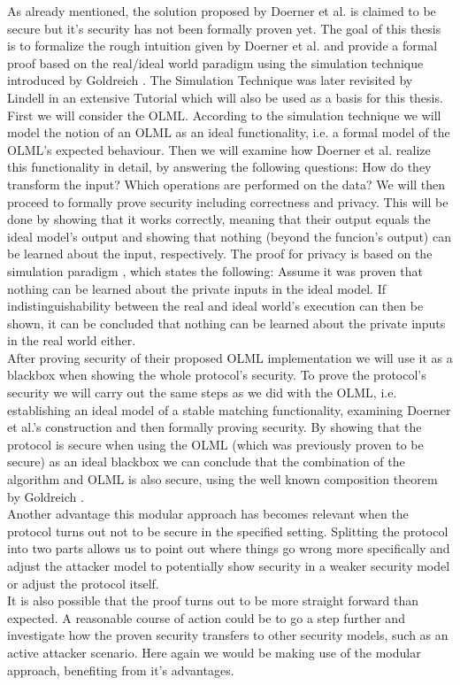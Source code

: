 As already mentioned, the solution proposed by Doerner et al. \citep{smas} is claimed to be secure but it's security has not been formally proven yet. The goal of this thesis is to formalize the rough intuition given by Doerner et al. and provide a formal proof based on the real/ideal world paradigm using the simulation technique introduced by Goldreich \citep{foc}. The Simulation Technique was later revisited by Lindell \citep{htsi} in an extensive Tutorial which will also be used as a basis for this thesis.\\
First we will consider the OLML. According to the simulation technique we will model the notion of an OLML as an ideal functionality, i.e. a formal model of the OLML's expected behaviour. Then we will examine how Doerner et al. realize this functionality in detail, by answering the following questions: How do they transform the input? Which operations are performed on the data? We will then proceed to formally prove security including correctness and privacy. This will be done by showing that it works correctly, meaning that their output equals the ideal model's output and showing that nothing (beyond the funcion's output) can be learned about the input, respectively. The proof for privacy is based on the simulation paradigm \citep{foc}, which states the following: Assume it was proven that nothing can be learned about the private inputs in the ideal model. If indistinguishability between the real and ideal world's execution can then be shown, it can be concluded that nothing can be learned about the private inputs in the real world either.\\
After proving security of their proposed OLML implementation we will use it as a blackbox when showing the whole protocol's security. To prove the protocol's security we will carry out the same steps as we did with the OLML, i.e. establishing an ideal model of a stable matching functionality, examining Doerner et al.'s construction and then formally proving security. By showing that the protocol is secure when using the OLML (which was previously proven to be secure) as an ideal blackbox we can conclude that the combination of the algorithm and OLML is also secure, using the well known composition theorem by Goldreich \citep{foc}.\\
Another advantage this modular approach has becomes relevant when the protocol turns out not to be secure in the specified setting. Splitting the protocol into two parts allows us to point out where things go wrong more specifically and adjust the attacker model to potentially show security in a weaker security model or adjust the protocol itself.\\
It is also possible that the proof turns out to be more straight forward than expected. A reasonable course of action could be to go a step further and investigate how the proven security transfers to other security models, such as an active attacker scenario. Here again we would be making use of the modular approach, benefiting from it's advantages.\\